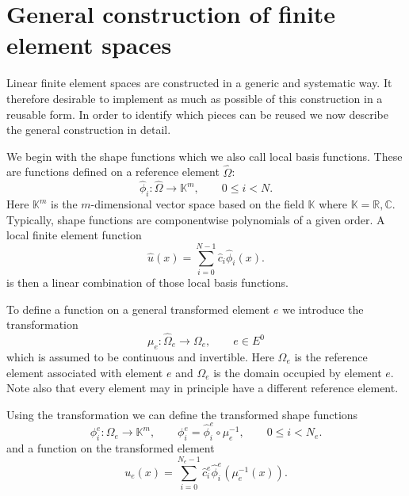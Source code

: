 \section{General construction of finite element spaces}

Linear finite element spaces are constructed in a generic and
systematic way. It therefore desirable to implement as much as
possible of this construction in a reusable form. In order to identify
which pieces can be reused we now describe the general construction in
detail. 

We begin with the shape functions which we also call
local basis functions. These are functions defined
on a reference element $\hat\Omega$:
\begin{equation}
\hat\phi_i : \hat\Omega \to \mathbb{K}^m, \qquad 0\leq i < N.
\end{equation}
Here $\mathbb{K}^m$ is the $m$-dimensional vector space based on the
field $\mathbb{K}$ where $\mathbb{K}=\mathbb{R}, \mathbb{C}$.
Typically, shape functions are componentwise polynomials of a given
order. 
A local finite element function 
\begin{equation*}
\hat{u}(x) = \sum_{i=0}^{N-1} \hat{c}_i \hat\phi_i(x) .
\end{equation*}
is then a linear combination of those
local basis functions.

To define a function on a general transformed element $e$ we introduce
the transformation 
\begin{equation}
\mu_e : \hat\Omega_e \to \Omega_e, \qquad e\in E^0
\end{equation}
which is assumed to be continuous and invertible.
Here $\hat\Omega_e$ is the reference element associated with element
$e$ and $\Omega_e$ is the domain occupied by element $e$. Note also
that every element may in principle have a different reference element.

Using the transformation we can define the transformed shape functions
\begin{equation}
\phi_i^e : \Omega_e \to \mathbb{K}^m, \qquad \phi_i^e =
\hat\phi_i^e\circ \mu_e^{-1}, \qquad 0\leq i < N_e.
\end{equation}
and a function on the transformed element
\begin{equation}
u_e(x) = \sum_{i=0}^{N_e-1} \hat{c}_i^e \hat\phi_i^e(\mu_e^{-1}(x)) .
\end{equation}

